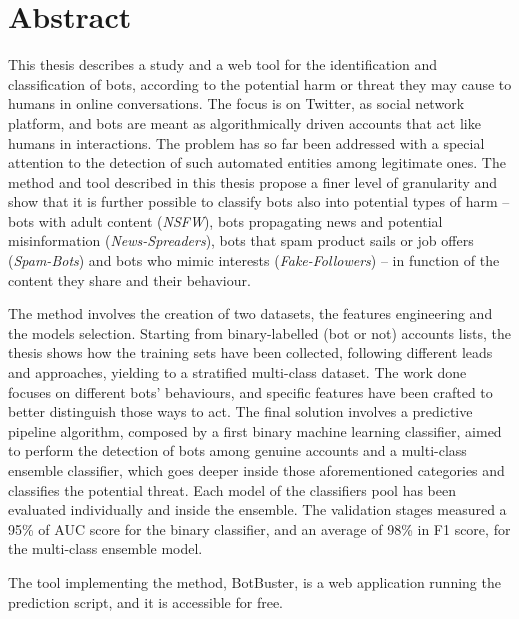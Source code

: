 
\newpage
\chapter*{Abstract}


This thesis describes a study and a web tool for the identification and classification of bots, according to the potential harm or threat they may cause to humans in online conversations. The focus is on Twitter, as social network platform, and bots are meant as algorithmically driven accounts that act like humans in interactions.
The problem has so far been addressed with a special attention to the detection of such automated entities among legitimate ones. The method and tool described in this thesis propose a finer level of granularity and show that it is further possible to classify bots also into potential types of harm --  bots with adult content (\textit{NSFW}), bots propagating news and potential misinformation (\textit{News-Spreaders}), bots that spam product sails or job offers (\textit{Spam-Bots}) and bots who mimic interests (\textit{Fake-Followers}) -- in function of the content they share and their behaviour.

The method involves the creation of two datasets, the features engineering and the models selection.
Starting from binary-labelled (bot or not) accounts lists, the thesis shows how the training sets have been collected, following different leads and approaches, yielding to a stratified multi-class dataset.
The work done focuses on different bots' behaviours, and specific features have been crafted to better distinguish those ways to act.
The final solution involves a predictive pipeline algorithm, composed by a first binary machine learning classifier, aimed to perform the detection of bots among genuine accounts and a multi-class ensemble classifier, which goes deeper inside those aforementioned categories and classifies the potential threat.
Each model of the classifiers pool has been evaluated individually and inside the ensemble. The validation stages measured a 95\% of AUC score for the binary classifier, and an average of 98\% in F1 score, for the multi-class ensemble model.

The tool implementing the method, BotBuster, is a web application running the prediction script, and it is accessible for free.




